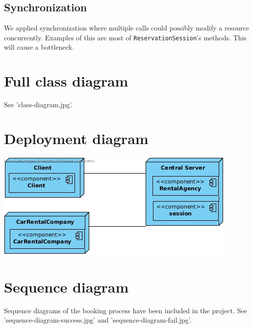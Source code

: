 \documentclass{scrartcl}
\begin{document}
    \subsection{Synchronization}
	We applied synchronization where multiple calls could possibly modify a resource
	concurrently. Examples of this are most of \texttt{ReservationSession}'s methods. 
	This will cause a bottleneck.
	
	\section{Full class diagram}
    See 'class-diagram.jpg'.

	\section{Deployment diagram}
    \includegraphics{deployment-diagram.jpg}

    \section{Sequence diagram}
    Sequence diagrams of the booking process have been included in the project.
    See 'sequence-diagram-success.jpg' and 'sequence-diagram-fail.jpg'.

\end{document}
